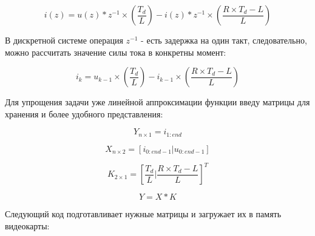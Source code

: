 \documentclass[11pt]{article}
\begin{document}
\[
i(z) = u(z)*z^{-1} \times (\dfrac{T_d}{L}) - i(z)*z^{-1} \times (\dfrac{R \times T_d - L}{L})
\]

В дискретной системе операция \(z^{-1}\) - есть задержка на один такт,
следовательно, можно рассчитать значение силы тока в конкретны момент:

\[
i_{k} = u_{k-1} \times (\dfrac{T_d}{L}) - i_{k-1} \times (\dfrac{R \times T_d - L}{L})
\]

    Для упрощения задачи уже линейной аппроксимации функции введу матрицы
для хранения и более удобного представления:

\[
Y_{n \times 1} = i_{1:end}
\]

\[
X_{n \times 2} = [ i_{0:end-1} | u_{0:end-1} ]
\]

\[
K_{2 \times 1} = [\dfrac{T_d}{L} | \dfrac{R \times T_d - L}{L}]^{T}
\]

\[
Y = X * K
\]

Следующий код подготавливает нужные матрицы и загружает их в память
видеокарты:

    
\end{document}
